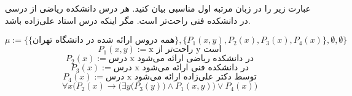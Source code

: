 عبارت زیر را در زبان مرتبه اول مناسبی بیان کنید.  
هر درس دانشکده ریاضی از درسی در دانشکده فنی راحت‌تر است. مگر اینکه درس استاد علی‌زاده باشد.
\quad\vspace{0.5 cm}	
\begin{ans}
	$$
		\mu := \{\{\text{همه دروس ارائه شده در دانشگاه تهران}\}, \{P_1(x, y), P_2(x), P_3(x), P_4(x)\}, \emptyset, \emptyset\}
	$$
	$$
		{P_1}(x, y) := \text {x راحت‌تر از y است}
	$$
	$$
		{P_2}(x) := \text{درس x در دانشکده ریاضی ارائه می‌شود}
	$$
	$$
		{P_3}(x) := \text{درس x در دانشکده فنی ارائه می‌شود}
	$$
	$$
		{P_4}(x) := \text{درس x توسط دکتر علی‌زاده ارائه می‌شود}
	$$
	$$
		\forall x \Big({P_2}(x) \rightarrow {\Big(\exists y \Big({P_3}(y) \Big) \wedge {P_1}(x, y)\Big)} \vee {P_4}(x)\Big)
	$$
\end{ans}
